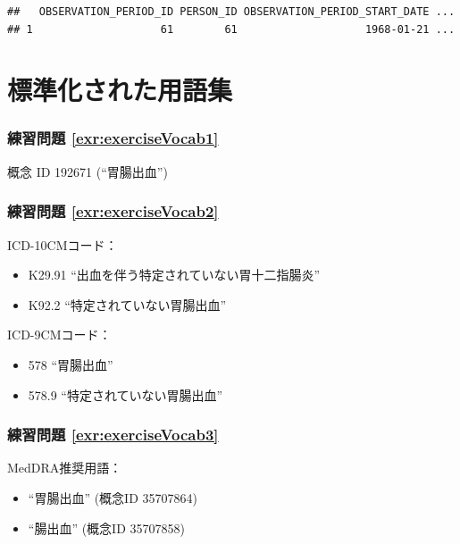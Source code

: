 \documentclass[
  11pt]{book}
\providecommand{\tightlist}{%
  \setlength{\itemsep}{0pt}\setlength{\parskip}{0pt}}
\theoremstyle{definition}
\theoremstyle{definition}
\theoremstyle{definition}
\theoremstyle{definition}
\theoremstyle{remark}
\begin{document}
\begin{verbatim}
##   OBSERVATION_PERIOD_ID PERSON_ID OBSERVATION_PERIOD_START_DATE ...
## 1                    61        61                    1968-01-21 ...
\end{verbatim}

\section{標準化された用語集}\label{Vocabanswers}

\subsubsection*{練習問題 \ref{exr:exerciseVocab1}}\label{ux7df4ux7fd2ux554fux984c-refexrexercisevocab1}

概念 ID 192671 (``胃腸出血'')

\subsubsection*{練習問題 \ref{exr:exerciseVocab2}}\label{ux7df4ux7fd2ux554fux984c-refexrexercisevocab2}

ICD-10CMコード：

\begin{itemize}
\tightlist
\item
  K29.91 ``出血を伴う特定されていない胃十二指腸炎''
\item
  K92.2 ``特定されていない胃腸出血''
\end{itemize}

ICD-9CMコード：

\begin{itemize}
\tightlist
\item
  578 ``胃腸出血''
\item
  578.9 ``特定されていない胃腸出血''
\end{itemize}

\subsubsection*{練習問題 \ref{exr:exerciseVocab3}}\label{ux7df4ux7fd2ux554fux984c-refexrexercisevocab3}

MedDRA推奨用語：

\begin{itemize}
\tightlist
\item
  ``胃腸出血'' (概念ID 35707864)
\item
  ``腸出血'' (概念ID 35707858)
\end{itemize}
\end{document}
